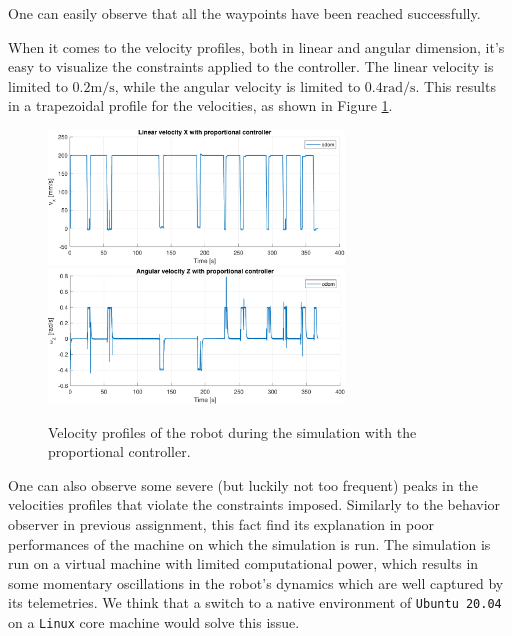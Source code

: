 One can easily observe that all the waypoints have been reached successfully.

When it comes to the velocity profiles, both in linear and angular dimension, it's easy to visualize the constraints applied to the controller.
The linear velocity is limited to $0.2 \text{m/s}$, while the angular velocity is limited to $0.4 \text{rad/s}$.
This results in a trapezoidal profile for the velocities, as shown in Figure \ref{fig:proportional_controller_velocity_profiles}.

\begin{figure}[H]
    \centering
    \includegraphics[width=0.7\textwidth]{./img/MATLAB/linear_velocity_proportional.pdf}
    \includegraphics[width=0.7\textwidth]{./img/MATLAB/angular_velocity_proportional.pdf}
    \caption{Velocity profiles of the robot during the simulation with the proportional controller.}
    \label{fig:proportional_controller_velocity_profiles}
\end{figure}

One can also observe some severe (but luckily not too frequent) peaks in the velocities profiles that violate the constraints imposed.
Similarly to the behavior observer in previous assignment, this fact find its explanation in poor performances of the machine on which the simulation is run.
The simulation is run on a virtual machine with limited computational power, which results in some momentary oscillations in the robot's dynamics which are well captured by its telemetries.
We think that a switch to a native environment of \texttt{Ubuntu 20.04} on a \texttt{Linux} core machine would solve this issue.
